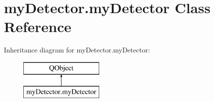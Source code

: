 \hypertarget{classmy_detector_1_1my_detector}{\section{my\-Detector.\-my\-Detector Class Reference}
\label{classmy_detector_1_1my_detector}
}
Inheritance diagram for my\-Detector.\-my\-Detector\-:\begin{figure}[H]
\begin{center}
\leavevmode
\includegraphics[height=2.000000cm]{classmy_detector_1_1my_detector}
\end{center}
\end{figure}
